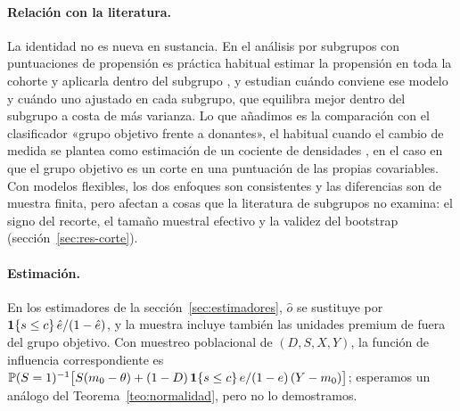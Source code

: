 \paragraph{Relación con la literatura.} La identidad no es nueva en sustancia. En el análisis por subgrupos con puntuaciones de propensión es práctica habitual estimar la propensión en toda la cohorte y aplicarla dentro del subgrupo \citep{rassen2012}, y \citet{dong2020} estudian cuándo conviene ese modelo y cuándo uno ajustado en cada subgrupo, que equilibra mejor dentro del subgrupo a costa de más varianza. Lo que añadimos es la comparación con el clasificador «grupo objetivo frente a donantes», el habitual cuando el cambio de medida se plantea como estimación de un cociente de densidades \citep{bickel2009,sugiyama2012}, en el caso en que el grupo objetivo es un corte en una puntuación de las propias covariables. Con modelos flexibles, los dos enfoques son consistentes y las diferencias son de muestra finita, pero afectan a cosas que la literatura de subgrupos no examina: el signo del recorte, el tamaño muestral efectivo y la validez del bootstrap (sección~\ref{sec:res-corte}).

\paragraph{Estimación.} En los estimadores de la sección~\ref{sec:estimadores}, $\hat o$ se sustituye por $\mathbf{1}\{s\le c\}\,\hat e/(1-\hat e)$, y la muestra incluye también las unidades premium de fuera del grupo objetivo. Con muestreo poblacional de $(D,S,X,Y)$, la función de influencia correspondiente es $\mathbb{P}(S=1)^{-1}\bigl[S(m_0-\theta)+(1-D)\,\mathbf{1}\{s\le c\}\,e/(1-e)\,(Y-m_0)\bigr]$; esperamos un análogo del Teorema~\ref{teo:normalidad}, pero no lo demostramos.
